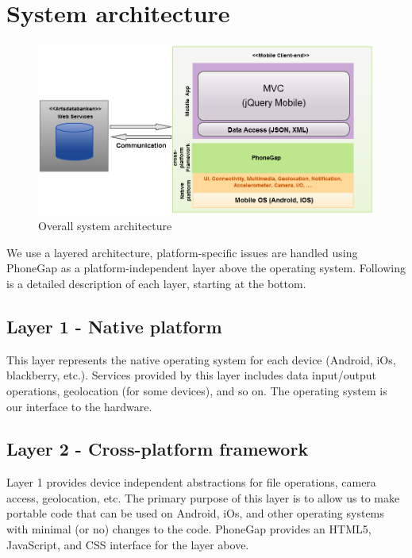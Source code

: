 \section{System architecture}
\begin{figure}[htb]
	\centering
	\includegraphics[width=1.0\textwidth]{architecture/architecture.png}
	\caption{Overall system architecture}
	\label{fig:architecture}
\end{figure}

We use a layered architecture, platform-specific issues are handled using
PhoneGap as a platform-independent layer above the operating system. Following
is a detailed description of each layer, starting at the bottom.

\subsection{Layer 1 - Native platform}

This layer represents the native operating system for each device (Android, iOs,
blackberry, etc.). Services provided by this layer includes data input/output
operations, geolocation (for some devices), and so on. The operating system is
our interface to the hardware.

\subsection{Layer 2 - Cross-platform framework}

Layer 1 provides device independent abstractions for file operations, camera
access, geolocation, etc. The primary purpose of this layer is to allow us to
make portable code that can be used on Android, iOs, and other operating systems
with minimal (or no) changes to the code. PhoneGap provides an HTML5,
JavaScript, and CSS interface for the layer above.

